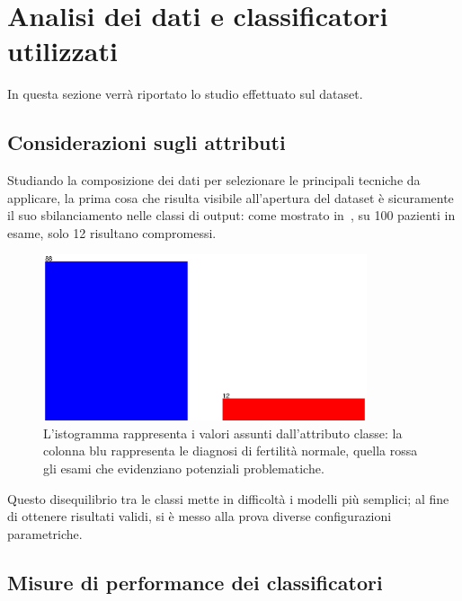 \section{Analisi dei dati e classificatori utilizzati}

In questa sezione verrà riportato lo studio effettuato sul dataset.

\subsection{Considerazioni sugli attributi}

Studiando la composizione dei dati per selezionare le principali tecniche da applicare,
la prima cosa che risulta visibile all'apertura del dataset è sicuramente il suo sbilanciamento nelle classi di output:
come mostrato in~, su 100 pazienti in esame, solo 12 risultano compromessi.

\begin{figure}[H]
  \centering
  \includegraphics[width=0.85\textwidth]{fig/classes.eps}%
  \caption{%
    L'istogramma rappresenta i valori assunti dall'attributo classe:
    la colonna blu rappresenta le diagnosi di fertilità normale,
    quella rossa gli esami che evidenziano potenziali problematiche.
  }%
  \label{fig:classes}
\end{figure}

Questo disequilibrio tra le classi mette in difficoltà i modelli più semplici;
al fine di ottenere risultati validi, si è messo alla prova diverse configurazioni parametriche.


\subsection{Misure di performance dei classificatori}

